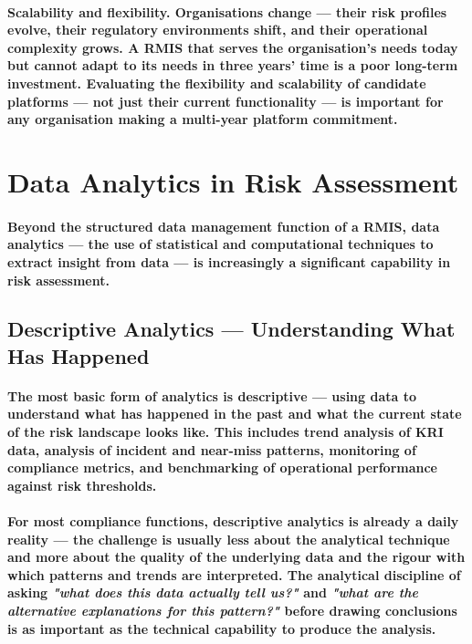 \paragraph{\textbf{Scalability and flexibility}. Organisations change — their risk profiles evolve, their regulatory environments shift, and their operational complexity grows. A RMIS that serves the organisation's needs today but cannot adapt to its needs in three years' time is a poor long-term investment. Evaluating the flexibility and scalability of candidate platforms — not just their current functionality — is important for any organisation making a multi-year platform commitment.}

\section{Data Analytics in Risk Assessment}
\paragraph{Beyond the structured data management function of a RMIS, \textbf{data analytics} — the use of statistical and computational techniques to extract insight from data — is increasingly a significant capability in risk assessment.}

\subsection{Descriptive Analytics — Understanding What Has Happened}
\paragraph{The most basic form of analytics is \textbf{descriptive} — using data to understand what has happened in the past and what the current state of the risk landscape looks like. This includes trend analysis of KRI data, analysis of incident and near-miss patterns, monitoring of compliance metrics, and benchmarking of operational performance against risk thresholds.}
\paragraph{For most compliance functions, descriptive analytics is already a daily reality — the challenge is usually less about the analytical technique and more about the quality of the underlying data and the rigour with which patterns and trends are interpreted. The analytical discipline of asking \textit{"what does this data actually tell us?"} and \textit{"what are the alternative explanations for this pattern?"} before drawing conclusions is as important as the technical capability to produce the analysis.}

